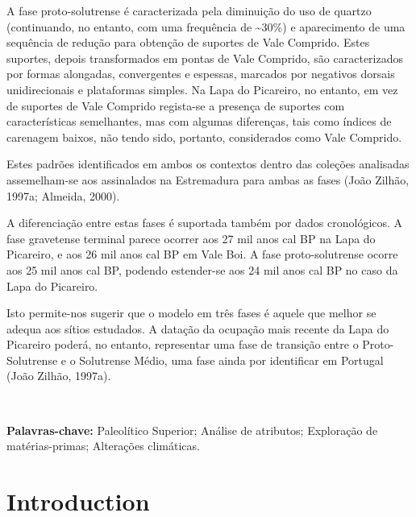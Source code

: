 \documentclass[12pt,twoside]{reedthesis}
\begin{document}
\begin{resumo}
    A fase proto-solutrense é caracterizada pela diminuição do uso de quartzo (continuando, no entanto, com uma frequência de \textasciitilde30\%) e aparecimento de uma sequência de redução para obtenção de suportes de Vale Comprido. Estes suportes, depois transformados em pontas de Vale Comprido, são caracterizados por formas alongadas, convergentes e espessas, marcados por negativos dorsais unidirecionais e plataformas simples. Na Lapa do Picareiro, no entanto, em vez de suportes de Vale Comprido regista-se a presença de suportes com características semelhantes, mas com algumas diferenças, tais como índices de carenagem baixos, não tendo sido, portanto, considerados como Vale Comprido.
    
    Estes padrões identificados em ambos os contextos dentro das coleções analisadas assemelham-se aos assinalados na Estremadura para ambas as fases (João Zilhão, 1997a; Almeida, 2000).
    
    A diferenciação entre estas fases é suportada também por dados cronológicos. A fase gravetense terminal parece ocorrer aos 27 mil anos cal BP na Lapa do Picareiro, e aos 26 mil anos cal BP em Vale Boi. A fase proto-solutrense ocorre aos 25 mil anos cal BP, podendo estender-se aos 24 mil anos cal BP no caso da Lapa do Picareiro.
    
    Isto permite-nos sugerir que o modelo em três fases é aquele que melhor se adequa aos sítios estudados. A datação da ocupação mais recente da Lapa do Picareiro poderá, no entanto, representar uma fase de transição entre o Proto-Solutrense e o Solutrense Médio, uma fase ainda por identificar em Portugal (João Zilhão, 1997a).
    
    ~
    
    \textbf{Palavras-chave:} Paleolítico Superior; Análise de atributos; Exploração de matérias-primas; Alterações climáticas.
  \end{resumo}
  \hypersetup{linkcolor=black}
  \setcounter{tocdepth}{2}
  \tableofcontents

  \listoftables

  \listoffigures


\mainmatter %
\pagestyle{fancyplain} %

\hypertarget{introduction}{%
\chapter{Introduction}\label{introduction}}
\end{document}
